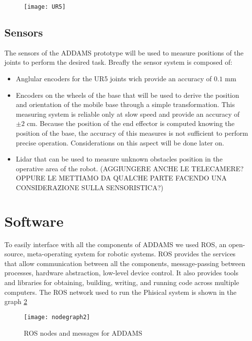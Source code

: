 \begin{figure}[htbp]
	\begin{center} 
		\texttt{[image: UR5]}
		\centering
		\label{fig:UR5} 
	\end{center}
\end{figure}


\subsection{Sensors}

The sensors of the ADDAMS prototype will be used to measure positions of the joints to perform the desired task. Breafly the sensor system is composed of:
\begin{itemize}
	\item Anglular encoders for the UR5 joints wich provide an accuracy of $0.1$ mm
	\item Encoders on the wheels of the base that will be used to derive the position and orientation of the mobile base through a simple transformation. This measuring system is reliable only at slow speed and provide an accuracy of $\pm 2$ cm. Because the position of the end effector is computed knowing the position of the base, the accuracy of this measures is not sufficient to perform precise operation. Considerations on this aspect will be done later on.
	\item Lidar that can be used to measure unknown obstacles position in the operative area of the robot.
	(AGGIUNGERE ANCHE LE TELECAMERE? OPPURE LE METTIAMO DA QUALCHE PARTE FACENDO UNA CONSIDERAZIONE SULLA SENSORISTICA?)
\end{itemize}

\section{Software}

To easily interface with all the components of ADDAMS we used ROS, an open-source, meta-operating system for robotic systems. ROS provides the services that allow communication between all the components, message-passing between processes, hardware abstraction, low-level device control. It also provides tools and libraries for obtaining, building, writing, and running code across multiple computers. The ROS network used to run the Phisical system is shown in the graph \ref{ROSnodes}

\begin{figure}[htbp]
	\begin{center} 
		\texttt{[image: nodegraph2]}
		\centering
		\label{ROSnodes} 
		\caption{ROS nodes and messages for ADDAMS}
	\end{center}
\end{figure}

